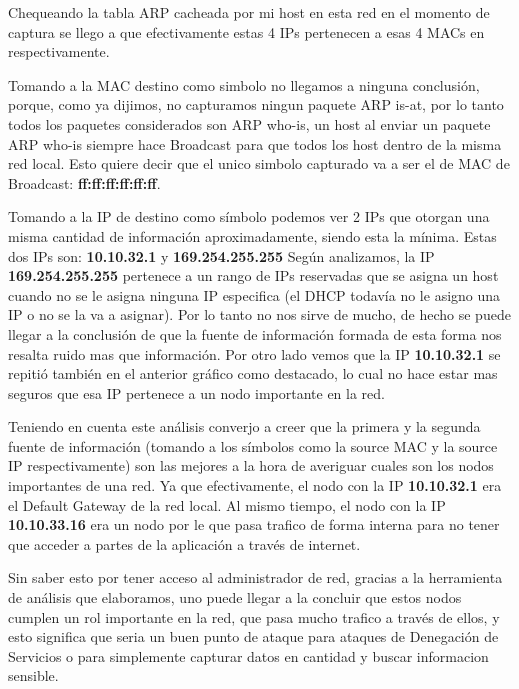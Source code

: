 \documentclass{article}
\theoremstyle{definition}
\theoremstyle{remark}
\begin{document}
Chequeando la tabla ARP cacheada por mi host en esta red en el momento de captura se llego a que efectivamente estas 4 IPs pertenecen a esas 4 MACs en respectivamente.\vspace{1mm}

Tomando a la MAC destino como simbolo no llegamos a ninguna conclusión, porque, como ya dijimos, no capturamos ningun paquete ARP is-at, por lo tanto todos los paquetes considerados son ARP who-is, un host al enviar un paquete ARP who-is siempre hace Broadcast para que todos los host dentro de la misma red local. Esto quiere decir que el unico simbolo capturado va a ser el de MAC de Broadcast: \textbf{ff:ff:ff:ff:ff:ff}.\vspace{1mm}

Tomando a la IP de destino como símbolo podemos ver 2 IPs que otorgan una misma cantidad de información aproximadamente, siendo esta la mínima.
Estas dos IPs son: \textbf{10.10.32.1} y \textbf{169.254.255.255}
Según analizamos, la IP \textbf{169.254.255.255} pertenece a un rango de IPs reservadas que se asigna un host cuando no se le asigna ninguna IP especifica (el DHCP todavía no le asigno una IP o no se la va a asignar). Por lo tanto no nos sirve de mucho, de hecho se puede llegar a la conclusión de que la fuente de información formada de esta forma nos resalta ruido mas que información. 
Por otro lado vemos que la IP  \textbf{10.10.32.1} se repitió también en el anterior gráfico como destacado, lo cual no hace estar mas seguros que esa IP pertenece a un nodo importante en la red.\vspace{1mm}

Teniendo en cuenta este análisis converjo a creer que la primera y la segunda fuente de información (tomando a los símbolos como la source MAC y la source IP respectivamente) son las mejores a la hora de averiguar cuales son los nodos importantes de una red. Ya que efectivamente, el nodo con la IP \textbf{10.10.32.1} era el Default Gateway de la red local.
Al mismo tiempo, el nodo con la IP \textbf{10.10.33.16} era un nodo por le que pasa trafico de forma interna para no tener que acceder a partes de la aplicación a través de internet.

Sin saber esto por tener acceso al administrador de red, gracias a la herramienta de análisis que elaboramos, uno puede llegar a la concluir que estos nodos cumplen un rol importante en la red, que pasa mucho trafico a través de ellos, y esto significa que seria un buen punto de ataque para ataques de Denegación de Servicios o para simplemente capturar datos en cantidad y buscar informacion sensible.
\end{document}
